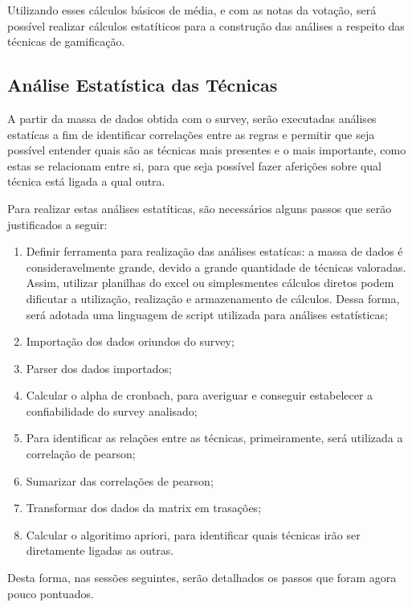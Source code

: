 Utilizando esses cálculos básicos de média, e com as notas da votação, será possível realizar cálculos estatíticos para a construção
das análises a respeito das técnicas de gamificação.



\subsection{Análise Estatística das Técnicas}
\label{sub:an_lise_estat_stica_das_t_cnicas}
A partir da massa de dados obtida com o survey, serão executadas análises estatícas a fim de identificar correlações
entre as regras e permitir que seja possível entender quais são as técnicas mais presentes e o mais importante, como
estas se relacionam entre si, para que seja possível fazer aferições sobre qual técnica está ligada a qual outra.

Para realizar estas análises estatíticas, são necessários alguns passos que serão justificados a seguir:

\begin{enumerate}
    \item Definir ferramenta para realização das análises estatícas: a massa de dados é consideravelmente grande, devido 
        a grande quantidade de técnicas valoradas. Assim, utilizar planilhas do excel ou simplesmentes cálculos diretos
        podem dificutar a utilização, realização e armazenamento de cálculos. Dessa forma, será adotada uma linguagem
        de script utilizada para análises estatísticas;
    \item Importação dos dados oriundos do survey;
    \item Parser dos dados importados;
    \item Calcular o alpha de cronbach, para averiguar e conseguir estabelecer a confiabilidade do survey analisado;
    \item Para identificar as relações entre as técnicas, primeiramente, será utilizada a correlação de pearson;
    \item Sumarizar das correlações de pearson;
    \item Transformar dos dados da matrix em trasações;
    \item Calcular o algoritimo apriori, para identificar quais técnicas irão ser diretamente ligadas as outras.
\end{enumerate}

Desta forma, nas sessões seguintes, serão detalhados os passos que foram agora pouco pontuados.

